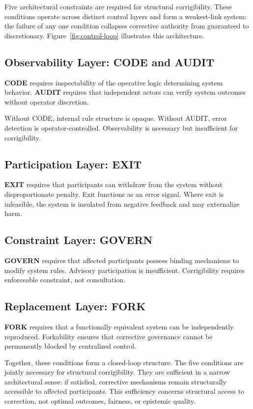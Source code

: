 \documentclass{article}
\begin{document}
Five architectural constraints are required for structural corrigibility. These conditions operate across distinct control layers and form a weakest-link system: the failure of any one condition collapses corrective authority from guaranteed to discretionary. Figure~\ref{fig:control-loop} illustrates this architecture.

\subsection{Observability Layer: CODE and AUDIT}

\textbf{CODE} requires inspectability of the operative logic determining system behavior. \textbf{AUDIT} requires that independent actors can verify system outcomes without operator discretion.

Without CODE, internal rule structure is opaque. Without AUDIT, error detection is operator-controlled. Observability is necessary but insufficient for corrigibility.

\subsection{Participation Layer: EXIT}

\textbf{EXIT} requires that participants can withdraw from the system without disproportionate penalty. Exit functions as an error signal. Where exit is infeasible, the system is insulated from negative feedback and may externalize harm.

\subsection{Constraint Layer: GOVERN}

\textbf{GOVERN} requires that affected participants possess binding mechanisms to modify system rules. Advisory participation is insufficient. Corrigibility requires enforceable constraint, not consultation.

\subsection{Replacement Layer: FORK}

\textbf{FORK} requires that a functionally equivalent system can be independently reproduced. Forkability ensures that corrective governance cannot be permanently blocked by centralized control.

Together, these conditions form a closed-loop structure. The five conditions are jointly necessary for structural corrigibility. They are sufficient in a narrow architectural sense: if satisfied, corrective mechanisms remain structurally accessible to affected participants. This sufficiency concerns structural access to correction, not optimal outcomes, fairness, or epistemic quality.
\end{document}
